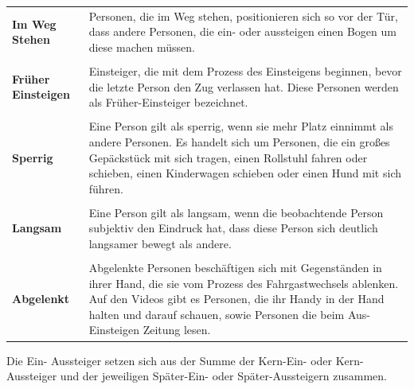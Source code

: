 \begin{longtable}{p{2 cm} p{12 cm}}
		\textbf{Im Weg Stehen} & Personen, die im Weg stehen, positionieren sich so vor der Tür, dass andere Personen, die ein- oder aussteigen einen Bogen um diese machen müssen.\\
		 & \\
		 \textbf{Früher Einsteigen}	& Einsteiger, die mit dem Prozess des Einsteigens beginnen, bevor die letzte Person den Zug verlassen hat. Diese Personen werden als Früher-Einsteiger bezeichnet.\\
		 & \\
		 \textbf{Sperrig} & Eine Person gilt als sperrig, wenn sie mehr Platz einnimmt als andere Personen. Es handelt sich um Personen, die ein großes  Gepäckstück mit sich tragen, einen Rollstuhl fahren oder schieben, einen Kinderwagen schieben oder einen Hund mit sich führen. \\
		 &\\
		 \textbf{Langsam} & Eine Person gilt als langsam, wenn die beobachtende Person subjektiv den Eindruck hat, dass diese Person sich deutlich langsamer bewegt als andere.\\
		 &\\	
		 \textbf{Abgelenkt} & Abgelenkte Personen beschäftigen sich mit Gegenständen in ihrer Hand, die sie vom Prozess des Fahrgastwechsels ablenken. Auf den Videos gibt es Personen, die ihr Handy in der Hand halten und darauf schauen, sowie Personen die beim Aus- \bzw Einsteigen Zeitung lesen.\\
\end{longtable}  
Die Ein- \bzw Aussteiger setzen sich aus der Summe der Kern-Ein- oder Kern-Aussteiger und der jeweiligen Später-Ein- oder Später-Aussteigern zusammen.
